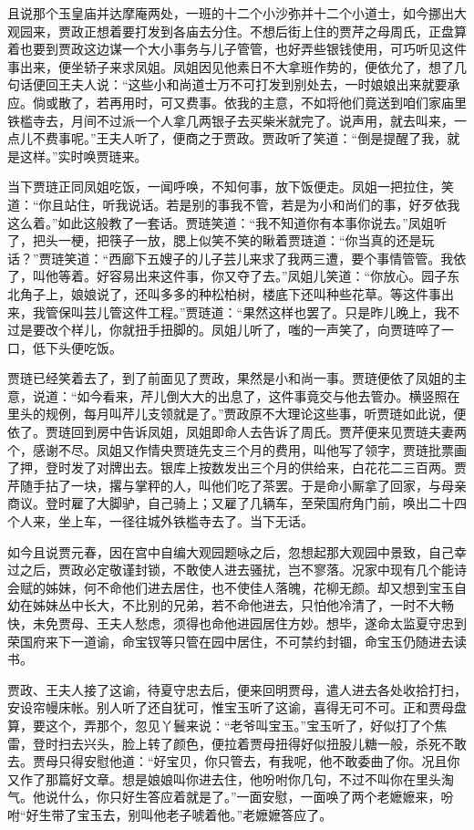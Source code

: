 \documentclass[12pt,oneside]{book}
\begin{document}
且说那个玉皇庙并达摩庵两处，一班的十二个小沙弥并十二个小道士，如今挪出大观园来，贾政正想着要打发到各庙去分住。不想后街上住的贾芹之母周氏，正盘算着也要到贾政这边谋一个大小事务与儿子管管，也好弄些银钱使用，可巧听见这件事出来，便坐轿子来求凤姐。凤姐因见他素日不大拿班作势的，便依允了，想了几句话便回王夫人说：“这些小和尚道士万不可打发到别处去，一时娘娘出来就要承应。倘或散了，若再用时，可又费事。依我的主意，不如将他们竟送到咱们家庙里铁槛寺去，月间不过派一个人拿几两银子去买柴米就完了。说声用，就去叫来，一点儿不费事呢。”王夫人听了，便商之于贾政。贾政听了笑道：“倒是提醒了我，就是这样。”实时唤贾琏来。

当下贾琏正同凤姐吃饭，一闻呼唤，不知何事，放下饭便走。凤姐一把拉住，笑道：“你且站住，听我说话。若是别的事我不管，若是为小和尚们的事，好歹依我这么着。”如此这般教了一套话。贾琏笑道：“我不知道你有本事你说去。”凤姐听了，把头一梗，把筷子一放，腮上似笑不笑的瞅着贾琏道：“你当真的还是玩话？”贾琏笑道：“西廊下五嫂子的儿子芸儿来求了我两三遭，要个事情管管。我依了，叫他等着。好容易出来这件事，你又夺了去。”凤姐儿笑道：“你放心。园子东北角子上，娘娘说了，还叫多多的种松柏树，楼底下还叫种些花草。等这件事出来，我管保叫芸儿管这件工程。”贾琏道：“果然这样也罢了。只是昨儿晚上，我不过是要改个样儿，你就扭手扭脚的。凤姐儿听了，嗤的一声笑了，向贾琏啐了一口，低下头便吃饭。

贾琏已经笑着去了，到了前面见了贾政，果然是小和尚一事。贾琏便依了凤姐的主意，说道：“如今看来，芹儿倒大大的出息了，这件事竟交与他去管办。横竖照在里头的规例，每月叫芹儿支领就是了。”贾政原不大理论这些事，听贾琏如此说，便依了。贾琏回到房中告诉凤姐，凤姐即命人去告诉了周氏。贾芹便来见贾琏夫妻两个，感谢不尽。凤姐又作情央贾琏先支三个月的费用，叫他写了领字，贾琏批票画了押，登时发了对牌出去。银库上按数发出三个月的供给来，白花花二三百两。贾芹随手拈了一块，撂与掌秤的人，叫他们吃了茶罢。于是命小厮拿了回家，与母亲商议。登时雇了大脚驴，自己骑上；又雇了几辆车，至荣国府角门前，唤出二十四个人来，坐上车，一径往城外铁槛寺去了。当下无话。

如今且说贾元春，因在宫中自编大观园题咏之后，忽想起那大观园中景致，自己幸过之后，贾政必定敬谨封锁，不敢使人进去骚扰，岂不寥落。况家中现有几个能诗会赋的姊妹，何不命他们进去居住，也不使佳人落魄，花柳无颜。却又想到宝玉自幼在姊妹丛中长大，不比别的兄弟，若不命他进去，只怕他冷清了，一时不大畅快，未免贾母、王夫人愁虑，须得也命他进园居住方妙。想毕，遂命太监夏守忠到荣国府来下一道谕，命宝钗等只管在园中居住，不可禁约封锢，命宝玉仍随进去读书。

贾政、王夫人接了这谕，待夏守忠去后，便来回明贾母，遣人进去各处收拾打扫，安设帘幔床帐。别人听了还自犹可，惟宝玉听了这谕，喜得无可不可。正和贾母盘算，要这个，弄那个，忽见丫鬟来说：“老爷叫宝玉。”宝玉听了，好似打了个焦雷，登时扫去兴头，脸上转了颜色，便拉着贾母扭得好似扭股儿糖一般，杀死不敢去。贾母只得安慰他道：“好宝贝，你只管去，有我呢，他不敢委曲了你。况且你又作了那篇好文章。想是娘娘叫你进去住，他吩咐你几句，不过不叫你在里头淘气。他说什么，你只好生答应着就是了。”一面安慰，一面唤了两个老嬷嬷来，吩咐“好生带了宝玉去，别叫他老子唬着他。”老嬷嬷答应了。
\end{document}
